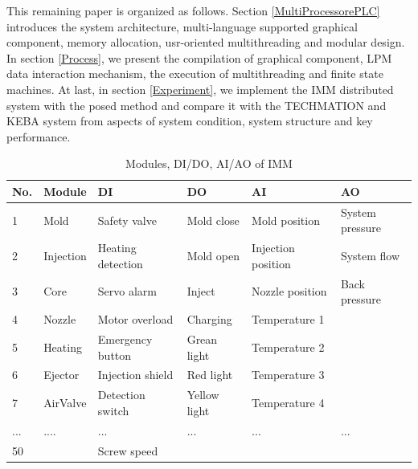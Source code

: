 \documentclass[journal,UTF8]{IEEEtran}
\begin{document}
This remaining paper is organized as follows. Section \ref{MultiProcessorePLC} introduces the system architecture, multi-language supported graphical component, memory allocation, usr-oriented multithreading and modular design. In section \ref{Process}, we present the compilation of graphical component, LPM data interaction mechanism, the execution of multithreading and finite state machines. At last, in section \ref{Experiment}, we implement the IMM distributed system with the posed method and compare it with the TECHMATION and KEBA system from aspects of system condition, system structure and key performance.
\begin{table}
	\scriptsize \caption{Modules, DI/DO, AI/AO of IMM}
	\label{table:IMMSystem}
	\begin{center}
		\renewcommand{\arraystretch}{1.4}
		\setlength\tabcolsep{3pt}
		\begin{tabular}{|p{0.3cm}|p{0.8cm}|p{1.8cm}|p{1.2cm}|p{1.8cm}|p{1.7cm}|}
			\hline
			No. & Module      & DI                       & DO           & AI                     & AO\\
			\hline
			1  & Mold       & Safety valve & Mold close     & Mold position        &System pressure \\
			\hline
			2  & Injection  & Heating detection & Mold open      & Injection position    &System flow\\
			\hline
			3  & Core      & Servo alarm         & Inject          & Nozzle position      &Back pressure\\
			\hline
			4  & Nozzle    & Motor overload            & Charging         & Temperature 1        &  \\
			\hline
			5  & Heating   & Emergency button           & Grean light       & Temperature 2        &\\
			\hline
			6  & Ejector   & Injection shield          & Red light         & Temperature 3       &\\
			\hline
			7  & AirValve & Detection switch          & Yellow light       & Temperature 4      &\\
            \hline
			...  & ....        & ...                       & ...                & ...                &...\\
            \hline
			50  &             & Screw speed                &                    &                     & \\
\hline
		\end{tabular}
	\end{center}
\end{table}
\end{document}
